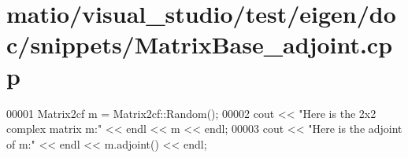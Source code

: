 \hypertarget{matio_2visual__studio_2test_2eigen_2doc_2snippets_2_matrix_base__adjoint_8cpp_source}{}\section{matio/visual\+\_\+studio/test/eigen/doc/snippets/\+Matrix\+Base\+\_\+adjoint.cpp}
\label{matio_2visual__studio_2test_2eigen_2doc_2snippets_2_matrix_base__adjoint_8cpp_source}

\begin{DoxyCode}
00001 Matrix2cf m = Matrix2cf::Random();
00002 cout << \textcolor{stringliteral}{"Here is the 2x2 complex matrix m:"} << endl << m << endl;
00003 cout << \textcolor{stringliteral}{"Here is the adjoint of m:"} << endl << m.adjoint() << endl;
\end{DoxyCode}
